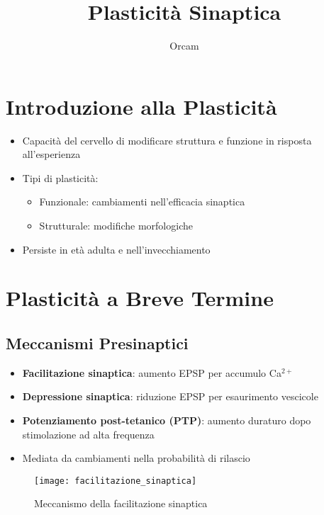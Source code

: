 \documentclass[12pt]{article}
\title{Plasticità Sinaptica}
\author{Orcam}
\date{}
\begin{document}
\maketitle

\section{Introduzione alla Plasticità}
\begin{itemize}
    \item Capacità del cervello di modificare struttura e funzione in risposta all'esperienza
    \item Tipi di plasticità:
    \begin{itemize}
        \item Funzionale: cambiamenti nell'efficacia sinaptica
        \item Strutturale: modifiche morfologiche
    \end{itemize}
    \item Persiste in età adulta e nell'invecchiamento
\end{itemize}

\section{Plasticità a Breve Termine}
\subsection{Meccanismi Presinaptici}
\begin{itemize}
    \item \textbf{Facilitazione sinaptica}: aumento EPSP per accumulo Ca$^{2+}$
    \item \textbf{Depressione sinaptica}: riduzione EPSP per esaurimento vescicole
    \item \textbf{Potenziamento post-tetanico (PTP)}: aumento duraturo dopo stimolazione ad alta frequenza
    \item Mediata da cambiamenti nella probabilità di rilascio
\end{itemize}

\begin{figure}[h]
    \centering
    \texttt{[image: facilitazione\_sinaptica]}
    \caption{Meccanismo della facilitazione sinaptica}
\end{figure}
\end{document}
